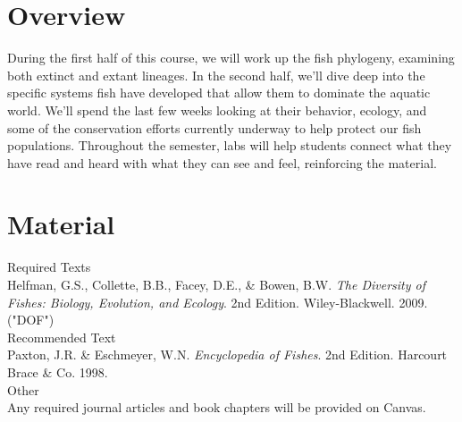 \documentclass[letterpaper]{inzane_syllabus} %
\begin{document}

\makeprofile %

\section{Overview}

During the first half of this course, we will work up the fish phylogeny, examining both extinct and extant lineages. In the second half, we'll dive deep into the specific systems fish have developed that allow them to dominate the aquatic world. We'll spend the last few weeks looking at their behavior, ecology, and some of the conservation efforts currently underway to help protect our fish populations. Throughout the semester, labs will help students connect what they have read and heard with what they can see and feel, reinforcing the material.

\vspace{0.5cm} %
\section{Material}

{\color{myCOLOR} Required Texts}\\
Helfman, G.S., Collette, B.B., Facey, D.E., \& Bowen, B.W. \textit{The Diversity of Fishes: Biology, Evolution, and Ecology}. 2nd Edition. Wiley-Blackwell. 2009. ("DOF") \\

{\color{myCOLOR} Recommended Text}\\
Paxton, J.R. \& Eschmeyer, W.N. \textit{Encyclopedia of Fishes}. 2nd Edition. Harcourt Brace \& Co. 1998. \\

{\color{myCOLOR} Other}\\
Any required journal articles and book chapters will be provided on Canvas. 
\end{document}
